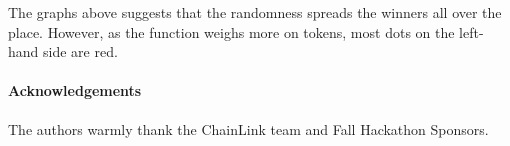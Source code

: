 \documentclass[runningheads]{llncs}
\begin{document}
The graphs above suggests that the randomness spreads the winners all over the place. However, as the function weighs more on tokens, most dots on the left-hand side are red.







\paragraph*{Acknowledgements} 
The authors warmly thank the ChainLink team and Fall Hackathon Sponsors.

%
%
% 
% 
%



\end{document}
